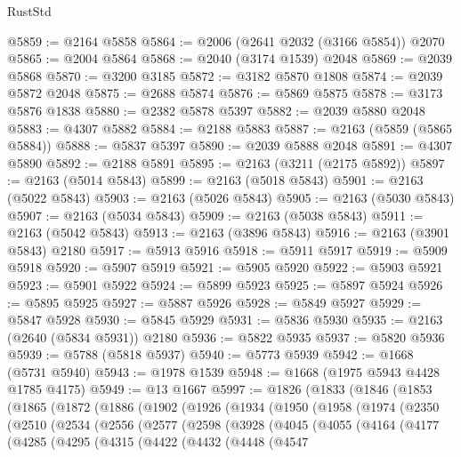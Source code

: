 \begin{lexlean}{RustStd}
\begin{coremodule}
@5859 := @2164 @5858
@5864 := @2006 (@2641 @2032 (@3166 @5854)) @2070
@5865 := @2004 @5864
@5868 := @2040 (@3174 @1539) @2048
@5869 := @2039 @5868
@5870 := @3200 @3185
@5872 := @3182 @5870 @1808
@5874 := @2039 @5872 @2048
@5875 := @2688 @5874
@5876 := @5869 @5875
@5878 := @3173 @5876 @1838
@5880 := @2382 @5878 @5397
@5882 := @2039 @5880 @2048
@5883 := @4307 @5882
@5884 := @2188 @5883
@5887 := @2163 (@5859 (@5865 @5884))
@5888 := @5837 @5397
@5890 := @2039 @5888 @2048
@5891 := @4307 @5890
@5892 := @2188 @5891
@5895 := @2163 (@3211 (@2175 @5892))
@5897 := @2163 (@5014 @5843)
@5899 := @2163 (@5018 @5843)
@5901 := @2163 (@5022 @5843)
@5903 := @2163 (@5026 @5843)
@5905 := @2163 (@5030 @5843)
@5907 := @2163 (@5034 @5843)
@5909 := @2163 (@5038 @5843)
@5911 := @2163 (@5042 @5843)
@5913 := @2163 (@3896 @5843)
@5916 := @2163 (@3901 @5843) @2180
@5917 := @5913 @5916
@5918 := @5911 @5917
@5919 := @5909 @5918
@5920 := @5907 @5919
@5921 := @5905 @5920
@5922 := @5903 @5921
@5923 := @5901 @5922
@5924 := @5899 @5923
@5925 := @5897 @5924
@5926 := @5895 @5925
@5927 := @5887 @5926
@5928 := @5849 @5927
@5929 := @5847 @5928
@5930 := @5845 @5929
@5931 := @5836 @5930
@5935 := @2163 (@2640 (@5834 @5931)) @2180
@5936 := @5822 @5935
@5937 := @5820 @5936
@5939 := @5788 (@5818 @5937)
@5940 := @5773 @5939
@5942 := @1668 (@5731 @5940)
@5943 := @1978 @1539
@5948 := @1668 (@1975 @5943 @4428 @1785 @4175)
@5949 := @13 @1667
@5997 := @1826
    (@1833
      (@1846
        (@1853
          (@1865
            (@1872
              (@1886
                (@1902
                  (@1926
                    (@1934
                      (@1950
                        (@1958
                          (@1974
                            (@2350
                              (@2510
                                (@2534
                                  (@2556
                                    (@2577
                                      (@2598
                                        (@3928
                                          (@4045
                                            (@4055
                                              (@4164
                                                (@4177
                                                  (@4285
                                                    (@4295
                                                      (@4315
                                                        (@4422
                                                          (@4432
                                                            (@4448
                                                              (@4547

\end{coremodule}
\end{lexlean}
